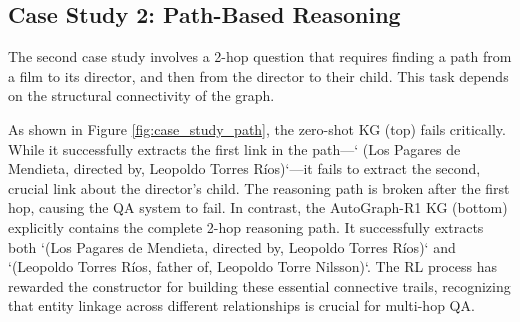 \documentclass[11pt]{article}
\begin{document}
\subsection{Case Study 2: Path-Based Reasoning}
The second case study involves a 2-hop question that requires finding a path from a film to its director, and then from the director to their child. This task depends on the structural connectivity of the graph.

As shown in Figure \ref{fig:case_study_path}, the zero-shot KG (top) fails critically. While it successfully extracts the first link in the path—` (Los Pagares de Mendieta, directed by, Leopoldo Torres Ríos)`—it fails to extract the second, crucial link about the director's child. The reasoning path is broken after the first hop, causing the QA system to fail. In contrast, the AutoGraph-R1 KG (bottom) explicitly contains the complete 2-hop reasoning path. It successfully extracts both `(Los Pagares de Mendieta, directed by, Leopoldo Torres Ríos)` and `(Leopoldo Torres Ríos, father of, Leopoldo Torre Nilsson)`. The RL process has rewarded the constructor for building these essential connective trails, recognizing that entity linkage across different relationships is crucial for multi-hop QA.
\end{document}
